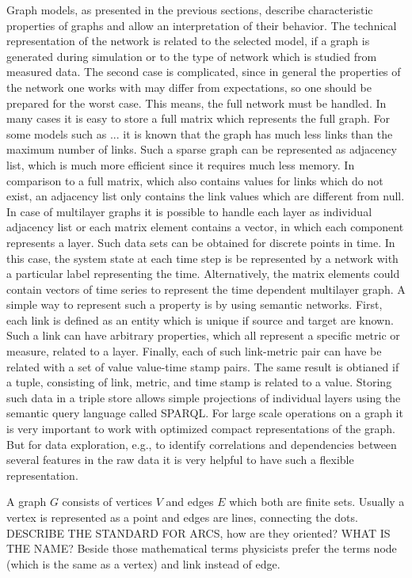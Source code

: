 \documentclass[a4paper,10pt]{scrbook}
\begin{document}
Graph models, as presented in the previous sections, describe characteristic properties of graphs and allow an interpretation of their behavior. The technical representation of the network is related to the selected model, if a graph is generated during simulation or to the type of network which is studied from measured data. The second case is complicated, since in general the properties of the network one works with may differ from expectations, so one should be prepared for the worst case. This means, the full network must be handled. In many cases it is easy to store a full matrix which represents the full graph. For some models such as ... it is known that the graph has much less links than the maximum number of links. Such a sparse graph can be represented as adjacency list, which is much more efficient since it requires much less memory. In comparison to a full matrix, which also contains values for links which do not exist, an adjacency list only contains the link values which are different from null. In case of multilayer graphs it is possible to handle each layer as individual adjacency list or each matrix element contains a vector, in which each component represents a layer. Such data sets can be obtained for discrete points in time. In this case, the system state at each time step is be represented by a network with a particular label representing the time. Alternatively, the matrix elements could contain vectors of time series to represent the time dependent multilayer graph. A simple way to represent such a property is by using semantic networks. First, each link is defined as an entity which is unique if source and target are known. Such a link can have arbitrary properties, which all represent a specific metric or measure, related to a layer. Finally, each of such link-metric pair can have be related with a set of value value-time stamp pairs. The same result is obtianed if a tuple, consisting of link, metric, and time stamp is related to a value. Storing such data in a triple store allows 
simple projections of individual layers using the semantic query language called SPARQL. For large scale operations on a graph it is very important to work with optimized compact representations of the graph. But for data exploration, e.g., to identify correlations and dependencies between several features in the raw data it is very helpful to have such a flexible representation. 

A graph $G$ consists of vertices $V$ and edges $E$ which both are finite sets. Usually a vertex is represented as a point and edges are lines, connecting the dots. DESCRIBE THE STANDARD FOR ARCS, how are they oriented? WHAT IS THE NAME? Beside those mathematical terms physicists prefer the terms node (which is the same as a vertex) and link instead of edge.
\end{document}
